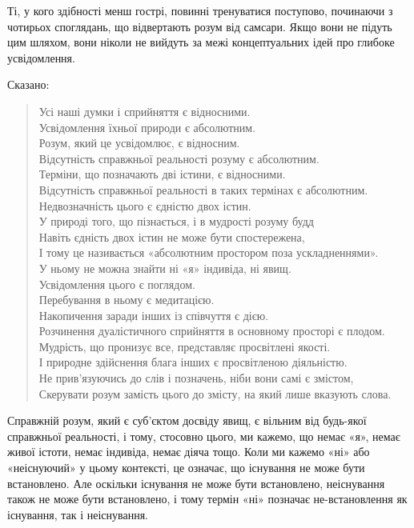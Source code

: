 \documentclass{article}
\begin{document}
Ті, у кого здібності менш гострі, повинні тренуватися поступово, починаючи з чотирьох споглядань, що відвертають розум від самсари. Якщо вони не підуть цим шляхом, вони ніколи не вийдуть за межі концептуальних ідей про глибоке усвідомлення.

Сказано:

\begin{verse}
        Усі наші думки і сприйняття є відносними. \\
        Усвідомлення їхньої природи є абсолютним. \\
        Розум, який це усвідомлює, є відносним. \\
        Відсутність справжньої реальності розуму є абсолютним. \\
        Терміни, що позначають дві істини, є відносними. \\
        Відсутність справжньої реальності в таких термінах є абсолютним. \\
        Недвозначність цього є єдністю двох істин. \\
        У природі того, що пізнається, і в мудрості розуму будд \\
        Навіть єдність двох істин не може бути спостережена, \\
        І тому це називається «абсолютним простором поза ускладненнями». \\
        У ньому не можна знайти ні «я» індивіда, ні явищ. \\
        Усвідомлення цього є поглядом. \\
        Перебування в ньому є медитацією. \\
        Накопичення заради інших із співчуття є дією. \\
        Розчинення дуалістичного сприйняття в основному просторі є плодом. \\
        Мудрість, що пронизує все, представляє просвітлені якості. \\
        І природне здійснення блага інших є просвітленою діяльністю. \\
        Не прив’язуючись до слів і позначень, ніби вони самі є змістом, \\
        Скерувати розум замість цього до змісту, на який лише вказують слова.
\end{verse}

Справжній розум, який є суб’єктом досвіду явищ, є вільним від будь-якої справжньої реальності, і тому, стосовно цього, ми кажемо, що немає «я», немає живої істоти, немає індивіда, немає діяча тощо. Коли ми кажемо «ні» або «неіснуючий» у цьому контексті, це означає, що існування не може бути встановлено. Але оскільки існування не може бути встановлено, неіснування також не може бути встановлено, і тому термін «ні» позначає не-встановлення як існування, так і неіснування.
\end{document}
